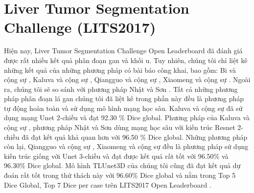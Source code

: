 \section{Liver Tumor Segmentation Challenge (LITS2017)}
Hiện nay, Liver Tumor Segmentation Challenge Open Leaderboard \cite{website:LiTS_learderboard}  đã đánh giá được rất nhiều kết quả phân đoạn gan và khối u. Tuy nhiên, chúng tôi chỉ liệt kê những kết quả của những phương pháp có bài báo công khai, bao gồm: Bi và cộng sự  \cite{Lei_paper}, Kaluva và cộng sự  \cite{Krishna_paper}, Qiangguo và cộng sự  \cite{Qiangguo_paper}, Xiaomeng và cộng sự  \cite{Xiaomeng_paper} . Ngoài ra, chúng tôi sẽ so sánh với phương pháp Nhật và Sơn \cite{Beichel_paper}. Tất cả những phương pháp phân đoạn lá gan chúng tôi đã liệt kê trong phần này đều là phương pháp tự động hoàn toàn và  sử dụng mô hình mạng học sâu. Kaluva và cộng sự  \cite{Krishna_paper} đã sử dụng mạng Unet 2-chiều và đạt 92.30 \% Dice global. Phương pháp của Kaluva và cộng sự  \cite{Krishna_paper}, phương pháp Nhật và Sơn \cite{Beichel_paper} dùng mạng học sâu với kiến trúc Resnet 2-chiều đã đạt kết quả khả quan hơn với 96.50 \% Dice global. Những phương pháp còn lại, Qiangguo và cộng sự  \cite{Qiangguo_paper}, Xiaomeng và cộng sự  \cite{Xiaomeng_paper} đều là phương pháp sử dụng kiến trúc giống với Unet 3-chiều và đạt được kết quả rất tốt với 96.50\% và 96.30\% Dice global. Mô hình TLUnet3D của chúng tôi cũng đã đạt kết quả dự đoán rất tốt trong thử thách này với 96.60\% Dice global và nằm trong Top 5 Dice Global, Top 7 Dice per case trên LITS2017 Open Leaderboard \cite{website:LiTS_learderboard}.

